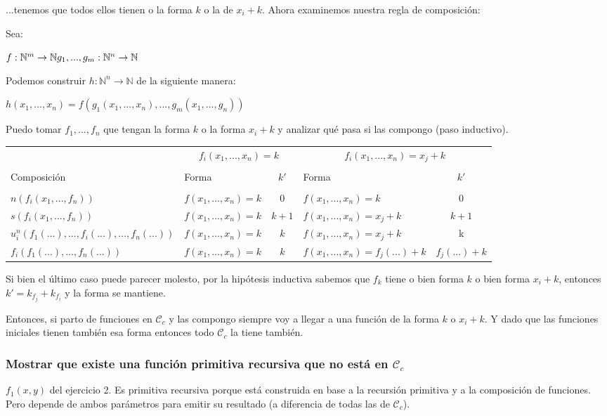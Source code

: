 \documentclass[11pt]{article} %
\newcommand{\desarrollo}[1]{

    \hspace{2em}
    \begin{minipage}{\textwidth}
        #1
    \end{minipage}

}
\newcommand{\nat}{\mathbb{N}}
\newcommand{\Ccur}{\mathcal{C}}
\begin{document}
...tenemos que todos ellos tienen o la forma $k$ o la de $x_i + k$. Ahora examinemos nuestra regla de composición:
\desarrollo{
Sea:
\desarrollo{$
f: \nat^m \to \nat \\
g_1, ..., g_m: \nat^n \to \nat
$}
Podemos construir $h: \nat^n \to \nat$ de la siguiente manera:
\desarrollo{$h(x_1, ..., x_n) = f(g_1(x_1, ..., x_n), ..., g_m(x_1, ..., g_n))$}
}

Puedo tomar $f_1, ..., f_n$ que tengan la forma $k$ o la forma $x_i + k$  y analizar qué pasa si las compongo (paso inductivo).
\desarrollo{
\begin{tabular}{l|l|c|l|c}
& \multicolumn{2}{c|}{$f_i(x_1, ..., x_n) = k$} & \multicolumn{2}{c}{$f_i(x_1, ..., x_n) = x_j + k$} \\ \cline{2-5}
&&&&\\[-1em] 
Composición & Forma &$k'$ & Forma & $k'$ \\ \hline
&&&&\\[-1em]
$n(f_i(x_1,...,f_n))$ & $f(x_1,...,x_n)=k$ & $0$ & $f(x_1,...,x_n)=k$ & $0$ \\
$s(f_i(x_1,...,f_n))$ & $f(x_1,...,x_n)=k$ & $k+1$ & $f(x_1,...,x_n)=x_j+k$ & $k+1$ \\
$u^n_i(f_1(...),...,f_i(...),...,f_n(...))$ & $f(x_1,...,x_n)=k$ & $k$ & $f(x_1,...,x_n)=x_j+k$ & k \\
$f_i(f_1(...),...,f_n(...))$ & $f(x_1,...,x_n)=k$ & $k$ & $f(x_1,...,x_n)=f_j(...)+k$ & $f_j(...)+k$
\end{tabular}
}

Si bien el último caso puede parecer molesto, por la hipótesis inductiva sabemos que $f_k$ tiene o bien forma $k$ o bien forma $x_i+k$, entonces $k'=k_{f_j}+k_{f_i}$ y la forma se mantiene.

Entonces, si parto de funciones en $\Ccur_c$ y las compongo siempre voy a llegar a una función de la forma $k$ o $x_i+k$. Y dado que las funciones iniciales tienen también esa forma entonces todo $\Ccur_c$ la tiene también.

\subsubsection{Mostrar que existe una función primitiva recursiva que no está en $\Ccur_c$}

$f_1(x,y)$ del ejercicio 2. Es primitiva recursiva porque está construida en base a la recursión primitiva y a la composición de funciones. Pero depende de ambos parámetros para emitir su resultado (a diferencia de todas las de $\Ccur_c$).
\end{document}
